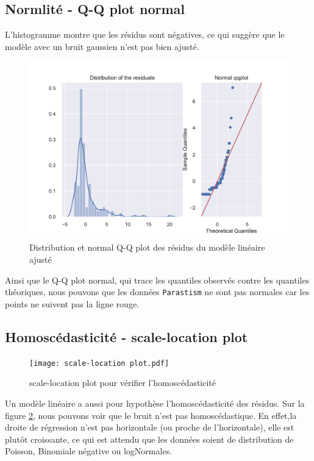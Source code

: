 \documentclass[12pt]{article}
\begin{document}
\subsection{Normlité - Q-Q plot normal}

L'histogramme montre que les résidus sont négatives, ce qui suggère que le modèle avec un bruit gaussien n'est pas bien ajusté.

\begin{figure}[h]
\centering
 \includegraphics[width=1\textwidth]{Distribution and normal QQ plot residuals .pdf}
 \caption{Distribution et normal Q-Q plot des résidus du modèle linéaire ajusté} 
 \label{norm_qq}
 \end{figure}

Ainsi que le Q-Q plot normal, qui trace les quantiles observés contre les quantiles théoriques, nous pouvons que les données \texttt{Parastism} ne sont pas normales car les points ne suivent pas la ligne rouge. 

\subsection{Homoscédasticité - scale-location plot}
\begin{figure}[h]
\centering
 \texttt{[image: scale-location plot.pdf]}
 \caption{scale-location plot pour vérifier l'homoscédasticité} 
 \label{homosc}
 \end{figure}
 
 Un modèle linéaire a aussi pour hypothèse l'homoscédasticité des résidus. Sur la figure \ref{homosc}, nous pouvons voir que le bruit n'est pas homoscédastique. En effet,la droite de régression n'est pas horizontale (ou proche de l'horizontale), elle est plutôt croissante, ce qui est attendu que les données soient de distribution de Poisson, Binomiale  négative ou logNormales.
 
\end{document}
